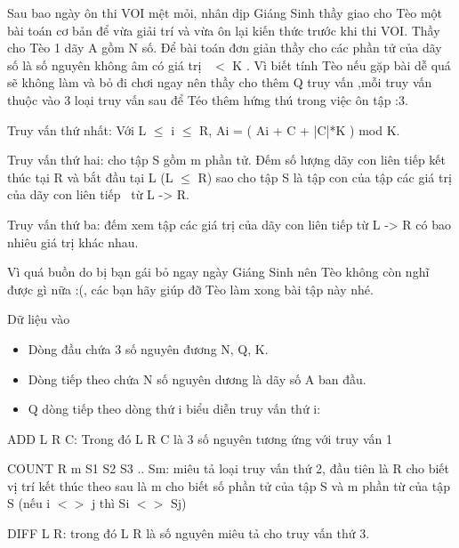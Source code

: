 







     Sau bao ngày ôn thi VOI mệt mỏi, nhân dịp Giáng Sinh thầy giao cho Tèo một bài toán cơ bản để vừa giải trí và vừa ôn lại kiến thức trước khi thi VOI. Thầy cho Tèo 1 dãy A gồm N số. Để bài toán đơn giản thầy cho các phần tử của dãy số là số nguyên không âm có giá trị  $<$ K . Vì biết tính Tèo nếu gặp bài dễ quá sẽ không làm và bỏ đi chơi ngay nên thầy cho thêm Q truy vấn ,mỗi truy vấn thuộc vào 3 loại truy vấn sau để Téo thêm hứng thú trong việc ôn tập :3.    






     Truy vấn thứ nhất: Với L  $\le$  i  $\le$  R, Ai = ( Ai + C + |C|*K ) mod K.    

     Truy vấn thứ hai: cho tập S gồm m phần tử. Đếm số lượng dãy con liên tiếp kết thúc tại R và bắt đầu tại L (L  $\le$  R) sao cho tập S là tập con của tập các giá trị của dãy con liên tiếp  từ L -> R.    

     Truy vấn thứ ba: đếm xem tập các giá trị của dãy con liên tiếp từ L -> R có bao nhiêu giá trị khác nhau.    






     Vì quá buồn do bị bạn gái bỏ ngay ngày Giáng Sinh nên Tèo không còn nghĩ được gì nữa :(, các bạn hãy giúp đỡ Tèo làm xong bài tập này nhé.    






     Dữ liệu vào    
\begin{itemize}
	\item      Dòng đầu chứa 3 số nguyên đương N, Q, K.    
	\item      Dòng tiếp theo chứa N số nguyên dương là dãy số A ban đầu.    
	\item      Q dòng tiếp theo dòng thứ i biểu diễn truy vấn thứ i:    
\end{itemize}

     ADD L R C: Trong đó L R C là 3 số nguyên tương ứng với truy vấn 1     


     COUNT R m S1 S2 S3 .. Sm: miêu tả loại truy vấn thứ 2, đầu tiên là R cho biết vị trí kết thúc theo sau là m cho biết số phần tử của tập S và m phần từ của tập S (nếu i $<$$>$ j thì Si $<$$>$ Sj)    

     DIFF L R: trong đó L R là số nguyên miêu tả cho truy vấn thứ 3.    






